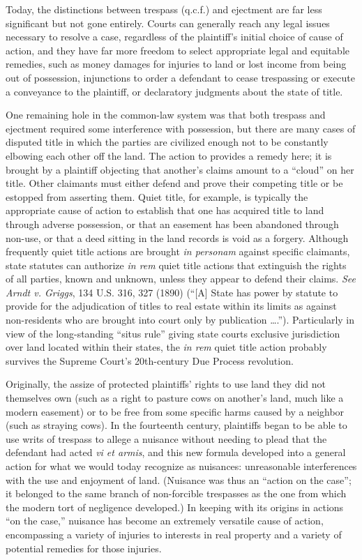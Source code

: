 Today, the distinctions between trespass (q.c.f.) and ejectment are far less
significant but not gone entirely. Courts can generally reach any legal issues
necessary to resolve a case, regardless of the plaintiff's initial choice of
cause of action, and they have far more freedom to select appropriate legal and
equitable remedies, such as money damages for injuries to land or lost income
from being out of possession, injunctions to order a defendant to cease
trespassing or execute a conveyance to the plaintiff, or declaratory judgments
about the state of title.

One remaining hole in the common-law system was that both trespass and ejectment
required some interference with possession, but there are many cases of
disputed title in which the parties are civilized enough not to be constantly
elbowing each other off the land. The action to  provides a
remedy here; it is brought by a plaintiff objecting that another's claims
amount to a ``cloud'' on her title. Other claimants must either defend and
prove their competing title or be estopped from asserting them. Quiet title,
for example, is typically the appropriate cause of action to establish that one
has acquired title to land through adverse possession, or that an easement has
been abandoned through non-use, or that a deed sitting in the land records is
void as a forgery. Although frequently quiet title actions are brought
\textit{in personam} against specific claimants, state statutes can authorize
\textit{in rem} quiet title actions that extinguish the rights of all parties,
known and unknown, unless they appear to defend their claims. \textit{See}
\textit{Arndt v. Griggs}, 134 U.S. 316, 327 (1890) (``[A] State has power by
statute to provide for the adjudication of titles to real estate within its
limits as against non-residents who are brought into court only by publication
\ldots.''). Particularly in view of the long-standing ``situs rule'' giving
state courts exclusive jurisdiction over land located within their states, the
\textit{in rem} quiet title action probably survives the Supreme Court's
20th-century Due Process revolution.

Originally, the assize of  protected plaintiffs' rights to use
land they did not themselves own (such as a right to pasture cows on another's
land, much like a modern easement) or to be free from some specific harms
caused by a neighbor (such as straying cows). In the fourteenth century,
plaintiffs began to be able to use writs of trespass to allege a nuisance
without needing to plead that the defendant had acted \textit{vi et armis}, and
this new formula developed into a general action for what we would today
recognize as nuisances: unreasonable interferences with the use and enjoyment
of land. (Nuisance was thus an ``action on the case''; it belonged to the same
branch of non-forcible trespasses as the one from which the modern tort of
negligence developed.) In keeping with its origins in actions ``on the case,''
nuisance has become an extremely versatile cause of action, encompassing a
variety of injuries to interests in real property and a variety of potential
remedies for those injuries.

